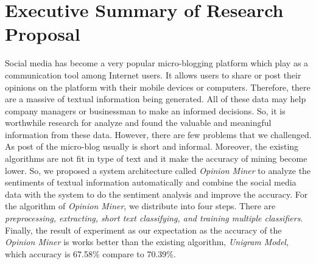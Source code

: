 \documentclass[a4paper,12pt]{article}
\begin{document}
\section{Executive Summary of Research Proposal} 
\hspace*{1cm}Social media has become a very popular micro-blogging platform which play as a communication tool among Internet users. It allows users to share or post their opinions on the platform with their mobile devices or computers. Therefore, there are a massive of textual information being generated. All of these data may help company managers or businessman to make an informed decisions. So, it is worthwhile research for analyze and found the valuable and meaningful information from these data. However, there are few problems that we challenged. As post of the micro-blog usually is short and informal. Moreover, the existing algorithms are not fit in type of text and it make the accuracy of mining become lower. So, we proposed a system architecture called  \textit{Opinion Miner} to analyze the sentiments of textual information automatically and combine the social media data with the system to do the sentiment analysis and improve the accuracy. For the algorithm of  \textit{Opinion Miner}, we distribute into four steps. There are \textit{preprocessing, extracting, short text classifying, and training multiple classifiers}. Finally, the result of experiment as our expectation as the accuracy of the  \textit{Opinion Miner} is works better than the existing algorithm,  \textit{Unigram Model}, which accuracy is 67.58\% compare to 70.39\%.
\end{document}

